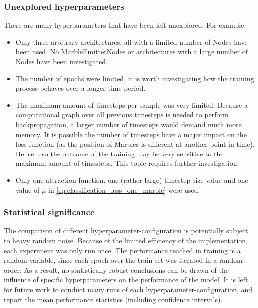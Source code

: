 \subsubsection{Unexplored hyperparameters}
There are many hyperparameters that have been left unexplored. For example:
\begin{itemize}
	\item Only three arbitrary architectures, all with a limited number of Nodes have been used. No MarbleEmitterNodes or architectures with a large number of Nodes have been investigated.
	\item The number of epochs were limited, it is worth investigating how the training process behaves over a longer time period.
	\item The maximum amount of timesteps per sample was very limited. Because a computational graph over all previous timesteps is needed to perform backpropagation, a larger number of timesteps would demand much more memory. It is possible the number of timesteps have a major impact on the loss function (as the position of Marbles is different at another point in time). Hence also the outcome of the training may be very sensitive to the maximum amount of timesteps. This topic requires further investigation.
	\item Only one attraction function, one (rather large) timestep-size value and one value of $\mu$ in \eqref{eq:classification_loss_one_marble} were used. 
\end{itemize} 

\subsubsection{Statistical significance}
The comparison of different hyperparameter-configuration is potentially subject to heavy random noise.
Because of the limited efficiency of the implementation, 
each experiment was only run once. 
The performance reached in training is a random variable, 
since each epoch over the train-set was iterated in a random order.
As a result, no statistically robust conclusions can be drawn
of the influence of specific hyperparameters on the performance of the model. 
It is left for future work to conduct many runs of each hyperparameter-configuration,
and report the mean performance statistics (including confidence intervals).

